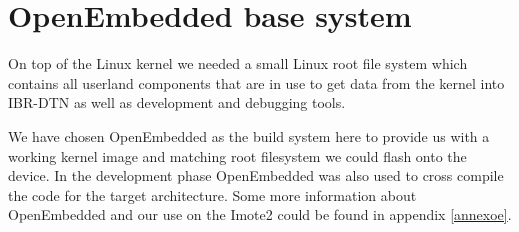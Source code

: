 \section{OpenEmbedded base system}
On top of the Linux kernel we needed a small Linux root file system which
contains all userland components that are in use to get data from the kernel
into IBR-DTN as well as development and debugging tools.

We have chosen OpenEmbedded as the build system here to provide us with a working
kernel image and matching root filesystem we could flash onto the device. In the
development phase OpenEmbedded was also used to cross compile the code for the
target architecture. Some more information about OpenEmbedded and our use on the
Imote2 could be found in appendix \ref{annexoe}.
